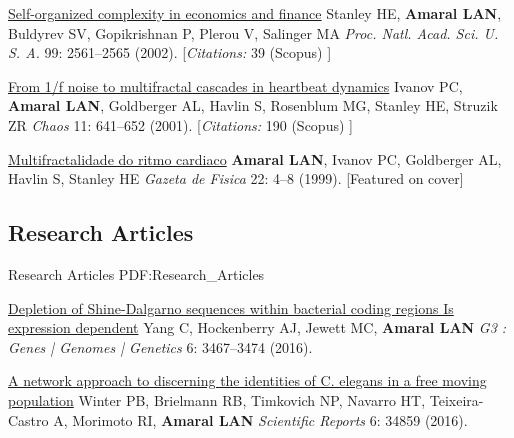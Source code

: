 \NumberedItem{\makebox[0.8cm][r]{[3]}}
\href{/people/amaral/self-organized-complexity-in-economics-and-finance}
{Self-organized complexity in economics and finance}
\newline
Stanley HE, {\textbf{Amaral LAN}}, Buldyrev SV, Gopikrishnan P, Plerou V, Salinger MA
\newline
\textit{Proc. Natl. Acad. Sci. U. S. A.}
    99:
2561--2565 (2002).
    [{\em{Citations:}}  39 (Scopus) ]
\newline
\Gap
~
\Gap

\NumberedItem{\makebox[0.8cm][r]{[2]}}
\href{/people/amaral/from-1f-noise-to-multifractal-cascades-in-heartbeat-dynamics}
{From 1/f noise to multifractal cascades in heartbeat dynamics}
\newline
Ivanov PC, {\textbf{Amaral LAN}}, Goldberger AL, Havlin S, Rosenblum MG, Stanley HE, Struzik ZR
\newline
\textit{Chaos}
    11:
641--652 (2001).
    [{\em{Citations:}}  190 (Scopus) ]
\newline
\Gap
~
\Gap

\NumberedItem{\makebox[0.8cm][r]{[1]}}
\href{False}
{Multifractalidade do ritmo cardiaco}
\newline
{\textbf{Amaral LAN}}, Ivanov PC, Goldberger AL, Havlin S, Stanley HE 
\newline
\textit{Gazeta de Fisica }
    22:
4--8  (1999).
    [Featured on cover]
\newline
\Gap
~
\Gap

\vspace*{0.2cm}\subsection
{Research Articles}
{Research Articles}
{PDF:Research_Articles}

\GapNoBreak
\NumberedItem{\makebox[0.8cm][r]{[119]}}
\href{/people/amaral/depletion-shine-dalgarno-sequences-within-bacterial-coding-regions-expression-dependent}
{Depletion of Shine-Dalgarno sequences within bacterial coding regions Is expression dependent}
\newline
Yang C, Hockenberry AJ, Jewett MC, {\textbf{Amaral LAN}}
\newline
\textit{G3 : Genes | Genomes | Genetics}
    6:
3467--3474 (2016).
\newline
\Gap
~
\Gap

\NumberedItem{\makebox[0.8cm][r]{[118]}}
\href{/people/amaral/network-approach-discerning-identities-c-elegans-free-moving-population}
{A network approach to discerning the identities of C. elegans in a free moving population}
\newline
Winter PB, Brielmann RB, Timkovich NP, Navarro HT, Teixeira-Castro A, Morimoto RI, {\textbf{Amaral LAN}}
\newline
\textit{Scientific Reports}
    6:
34859 (2016).
\newline
\Gap
~
\Gap

